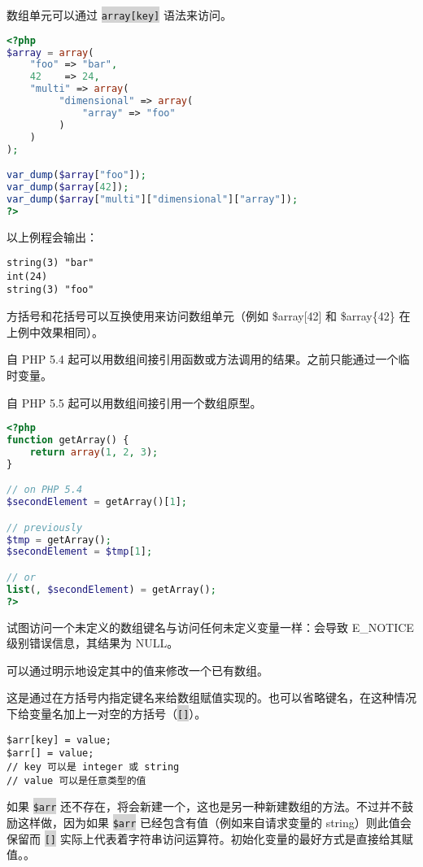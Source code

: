 数组单元可以通过 \colorbox{lightgray}{\texttt{array[key]}} 语法来访问。

\begin{lstlisting}[language=PHP]
<?php
$array = array(
    "foo" => "bar",
    42    => 24,
    "multi" => array(
         "dimensional" => array(
             "array" => "foo"
         )
    )
);

var_dump($array["foo"]);
var_dump($array[42]);
var_dump($array["multi"]["dimensional"]["array"]);
?>
\end{lstlisting}

以上例程会输出：


\begin{verbatim}
string(3) "bar"
int(24)
string(3) "foo"
\end{verbatim}

方括号和花括号可以互换使用来访问数组单元（例如 \$array[42] 和 \$array\{42\} 在上例中效果相同）。

自 PHP 5.4 起可以用数组间接引用函数或方法调用的结果。之前只能通过一个临时变量。

自 PHP 5.5 起可以用数组间接引用一个数组原型。

\begin{lstlisting}[language=PHP]
<?php
function getArray() {
    return array(1, 2, 3);
}

// on PHP 5.4
$secondElement = getArray()[1];

// previously
$tmp = getArray();
$secondElement = $tmp[1];

// or
list(, $secondElement) = getArray();
?>
\end{lstlisting}

试图访问一个未定义的数组键名与访问任何未定义变量一样：会导致 E\_NOTICE 级别错误信息，其结果为 NULL。

可以通过明示地设定其中的值来修改一个已有数组。

这是通过在方括号内指定键名来给数组赋值实现的。也可以省略键名，在这种情况下给变量名加上一对空的方括号（\colorbox{lightgray}{\texttt{[]}}）。

\begin{verbatim}
$arr[key] = value;
$arr[] = value;
// key 可以是 integer 或 string
// value 可以是任意类型的值
\end{verbatim}

如果 \colorbox{lightgray}{\texttt{\$arr}} 还不存在，将会新建一个，这也是另一种新建数组的方法。不过并不鼓励这样做，因为如果 \colorbox{lightgray}{\texttt{\$arr}} 已经包含有值（例如来自请求变量的 string）则此值会保留而 \colorbox{lightgray}{\texttt{[]}} 实际上代表着字符串访问运算符。初始化变量的最好方式是直接给其赋值。。

